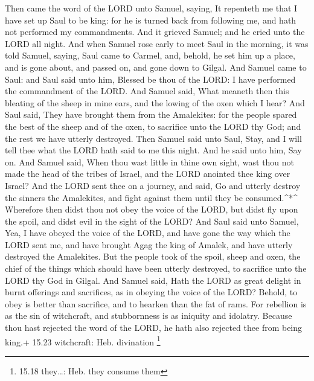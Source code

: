  Then came the word of the LORD unto Samuel, saying,
 It repenteth me that I have set up Saul to be king: for he
is turned back from following me, and hath not performed my
commandments. And it grieved Samuel; and he cried unto the LORD all
night.  And when Samuel rose early to meet Saul in the
morning, it was told Samuel, saying, Saul came to Carmel, and, behold,
he set him up a place, and is gone about, and passed on, and gone down
to Gilgal.  And Samuel came to Saul: and Saul said unto
him, Blessed be thou of the LORD: I have performed the commandment of
the LORD.  And Samuel said, What meaneth then this bleating
of the sheep in mine ears, and the lowing of the oxen which I hear?
 And Saul said, They have brought them from the Amalekites:
for the people spared the best of the sheep and of the oxen, to
sacrifice unto the LORD thy God; and the rest we have utterly destroyed.
 Then Samuel said unto Saul, Stay, and I will tell thee
what the LORD hath said to me this night. And he said unto him, Say on.
 And Samuel said, When thou wast little in thine own sight,
wast thou not made the head of the tribes of Israel, and the LORD
anointed thee king over Israel?  And the LORD sent thee on
a journey, and said, Go and utterly destroy the sinners the Amalekites,
and fight against them until they be consumed.\^{}*\^{} 
Wherefore then didst thou not obey the voice of the LORD, but didst fly
upon the spoil, and didst evil in the sight of the LORD? 
And Saul said unto Samuel, Yea, I have obeyed the voice of the LORD, and
have gone the way which the LORD sent me, and have brought Agag the king
of Amalek, and have utterly destroyed the Amalekites.  But
the people took of the spoil, sheep and oxen, the chief of the things
which should have been utterly destroyed, to sacrifice unto the LORD thy
God in Gilgal.  And Samuel said, Hath the LORD as great
delight in burnt offerings and sacrifices, as in obeying the voice of
the LORD? Behold, to obey is better than sacrifice, and to hearken than
the fat of rams.  For rebellion is as the sin of
witchcraft, and stubbornness is as iniquity and idolatry. Because thou
hast rejected the word of the LORD, he hath also rejected thee from
being king.+ 15.23 witchcraft: Heb. divination \footnote{15.18
  they\ldots: Heb. they consume them}

